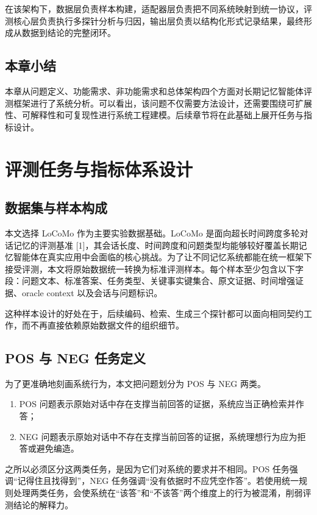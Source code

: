 在该架构下，数据层负责样本构建，适配器层负责把不同系统映射到统一协议，评测核心层负责执行多探针分析与归因，输出层负责以结构化形式记录结果，最终形成从数据到结论的完整闭环。

\section{本章小结}

本章从问题定义、功能需求、非功能需求和总体架构四个方面对长期记忆智能体评测框架进行了系统分析。可以看出，该问题不仅需要方法设计，还需要围绕可扩展性、可解释性和可复现性进行系统工程建模。后续章节将在此基础上展开任务与指标设计。

\chapter{评测任务与指标体系设计}

\section{数据集与样本构成}

本文选择 LoCoMo 作为主要实验数据基础。LoCoMo 是面向超长时间跨度多轮对话记忆的评测基准 [1]，其会话长度、时间跨度和问题类型均能够较好覆盖长期记忆智能体在真实应用中会面临的核心挑战。为了让不同记忆系统都能在统一框架下接受评测，本文将原始数据统一转换为标准评测样本。每个样本至少包含以下字段：问题文本、标准答案、任务类型、关键事实键集合、原文证据、时间增强证据、oracle context 以及会话与问题标识。

这种样本设计的好处在于，后续编码、检索、生成三个探针都可以面向相同契约工作，而不再直接依赖原始数据文件的组织细节。

\section{POS 与 NEG 任务定义}

为了更准确地刻画系统行为，本文把问题划分为 POS 与 NEG 两类。

\begin{enumerate}
    \item POS 问题表示原始对话中存在支撑当前回答的证据，系统应当正确检索并作答；
    \item NEG 问题表示原始对话中不存在支撑当前回答的证据，系统理想行为应为拒答或避免编造。
\end{enumerate}

之所以必须区分这两类任务，是因为它们对系统的要求并不相同。POS 任务强调“记得住且找得到”，NEG 任务强调“没有依据时不应凭空作答”。若使用统一规则处理两类任务，会使系统在“该答”和“不该答”两个维度上的行为被混淆，削弱评测结论的解释力。

